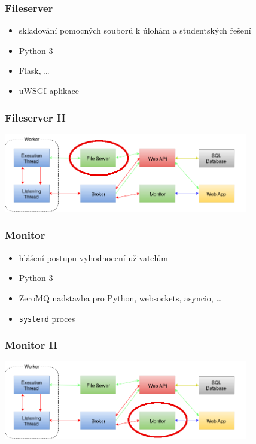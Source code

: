 \documentclass{beamer}
\begin{document}
\begin{frame}
	\frametitle{Fileserver}
	\begin{itemize}
		\item skladování pomocných souborů k úlohám a studentských řešení
		\item Python 3
		\item Flask, \dots
		\item uWSGI aplikace
	\end{itemize}
\end{frame}

\begin{frame}
	\frametitle{Fileserver II}
	\begin{center}
		\includegraphics[width=0.8\textwidth]{images/communication-fileserver.png}
	\end{center}
\end{frame}

\begin{frame}
	\frametitle{Monitor}
	\begin{itemize}
		\item hlášení postupu vyhodnocení uživatelům
		\item Python 3
		\item ZeroMQ nadstavba pro Python, websockets, asyncio, \dots
		\item \texttt{systemd} proces
	\end{itemize}
\end{frame}

\begin{frame}
	\frametitle{Monitor II}
	\begin{center}
		\includegraphics[width=0.8\textwidth]{images/communication-monitor.png}
	\end{center}
\end{frame}
\end{document}
